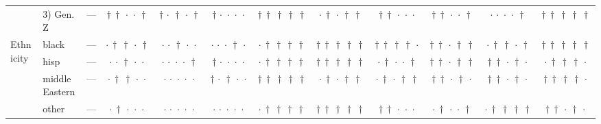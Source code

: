 {\begin{longtable}[t]{llcccccccccc}
 & 3) Gen. Z & --- & ${\dagger}\,{\dagger}\,{\cdot}\,{\cdot}\,{\dagger}$ & ${\dagger}\,{\cdot}\,{\dagger}\,{\cdot}\,{\dagger}$ & ${\dagger}\,{\cdot}\,{\cdot}\,{\cdot}\,{\cdot}$ & ${\dagger}\,{\dagger}\,{\dagger}\,{\dagger}\,{\dagger}$ & ${\cdot}\,{\dagger}\,{\cdot}\,{\dagger}\,{\dagger}$ & ${\dagger}\,{\dagger}\,{\cdot}\,{\cdot}\,{\cdot}$ & ${\dagger}\,{\dagger}\,{\cdot}\,{\cdot}\,{\dagger}$ & ${\cdot}\,{\cdot}\,{\cdot}\,{\cdot}\,{\dagger}$ & ${\dagger}\,{\dagger}\,{\dagger}\,{\dagger}\,{\dagger}$ \\
\cline{1-12}
\multirow[t]{5}{*}{Ethnicity} & black & --- & ${\cdot}\,{\dagger}\,{\dagger}\,{\cdot}\,{\dagger}$ & ${\cdot}\,{\cdot}\,{\dagger}\,{\cdot}\,{\cdot}$ & ${\cdot}\,{\cdot}\,{\cdot}\,{\dagger}\,{\cdot}$ & ${\cdot}\,{\dagger}\,{\dagger}\,{\dagger}\,{\dagger}$ & ${\dagger}\,{\dagger}\,{\dagger}\,{\dagger}\,{\dagger}$ & ${\dagger}\,{\dagger}\,{\dagger}\,{\dagger}\,{\cdot}$ & ${\dagger}\,{\dagger}\,{\cdot}\,{\dagger}\,{\dagger}$ & ${\cdot}\,{\dagger}\,{\dagger}\,{\cdot}\,{\dagger}$ & ${\dagger}\,{\dagger}\,{\dagger}\,{\dagger}\,{\dagger}$ \\
 & hisp & --- & ${\cdot}\,{\cdot}\,{\dagger}\,{\cdot}\,{\cdot}$ & ${\cdot}\,{\cdot}\,{\cdot}\,{\cdot}\,{\dagger}$ & ${\dagger}\,{\cdot}\,{\cdot}\,{\cdot}\,{\cdot}$ & ${\cdot}\,{\dagger}\,{\dagger}\,{\dagger}\,{\dagger}$ & ${\dagger}\,{\dagger}\,{\dagger}\,{\dagger}\,{\dagger}$ & ${\cdot}\,{\dagger}\,{\cdot}\,{\cdot}\,{\dagger}$ & ${\dagger}\,{\dagger}\,{\cdot}\,{\dagger}\,{\dagger}$ & ${\dagger}\,{\dagger}\,{\cdot}\,{\dagger}\,{\cdot}$ & ${\cdot}\,{\dagger}\,{\dagger}\,{\dagger}\,{\cdot}$ \\
 & middleEastern & --- & ${\cdot}\,{\dagger}\,{\dagger}\,{\cdot}\,{\cdot}$ & ${\cdot}\,{\cdot}\,{\cdot}\,{\cdot}\,{\cdot}$ & ${\dagger}\,{\cdot}\,{\dagger}\,{\cdot}\,{\cdot}$ & ${\dagger}\,{\dagger}\,{\dagger}\,{\dagger}\,{\dagger}$ & ${\cdot}\,{\dagger}\,{\cdot}\,{\dagger}\,{\dagger}$ & ${\cdot}\,{\dagger}\,{\cdot}\,{\dagger}\,{\dagger}$ & ${\dagger}\,{\dagger}\,{\cdot}\,{\dagger}\,{\cdot}$ & ${\dagger}\,{\dagger}\,{\cdot}\,{\dagger}\,{\cdot}$ & ${\dagger}\,{\dagger}\,{\dagger}\,{\dagger}\,{\cdot}$ \\
 & other & --- & ${\cdot}\,{\dagger}\,{\cdot}\,{\cdot}\,{\cdot}$ & ${\cdot}\,{\cdot}\,{\cdot}\,{\cdot}\,{\cdot}$ & ${\cdot}\,{\cdot}\,{\cdot}\,{\cdot}\,{\cdot}$ & ${\cdot}\,{\dagger}\,{\dagger}\,{\dagger}\,{\dagger}$ & ${\dagger}\,{\dagger}\,{\dagger}\,{\dagger}\,{\dagger}$ & ${\dagger}\,{\dagger}\,{\cdot}\,{\cdot}\,{\cdot}$ & ${\cdot}\,{\dagger}\,{\cdot}\,{\cdot}\,{\dagger}$ & ${\cdot}\,{\dagger}\,{\dagger}\,{\dagger}\,{\dagger}$ & ${\dagger}\,{\dagger}\,{\cdot}\,{\dagger}\,{\cdot}$ \\

\end{longtable}}
